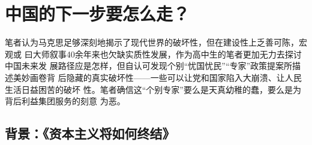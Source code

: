 \chapter{中国的下一步要怎么走？}


笔者认为马克思足够深刻地揭示了现代世界的破坏性，但在建设性上乏善可陈，宏观或
曰大师叙事40余年来也欠缺实质性发展，作为高中生的笔者更加无力去探讨中国未来发
展路径应是怎样，但自认可发现个别“忧国忧民”“专家”政策提案所描述美妙画卷背
后隐藏的真实破坏性——一些可以让党和国家陷入大崩溃、让人民生活日益困苦的破坏
性。笔者确信这“个别专家”要么是天真幼稚的蠢，要么是为背后利益集团服务的刻意
为恶。


\section{背景：《资本主义将如何终结》 }

